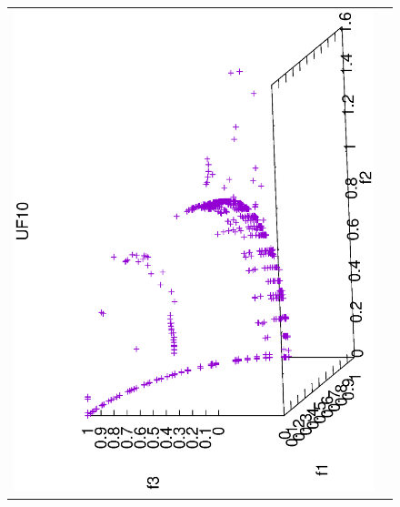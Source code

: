 \begin{figure}[H]
\begin{tabular}{cc}
 \includegraphics[scale=0.3, angle=-90,origin=c]{Figures_Chapter7/Results_Chapter4/Summary_Representative/VSD-MOEA-D/UF10.eps} 
\end{tabular}
\end{figure}

